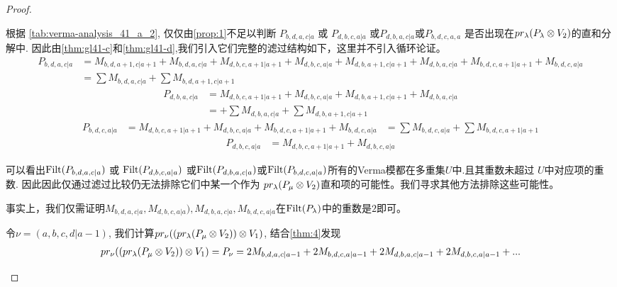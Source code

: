 \begin{proof}
\begin{enumerate}
\begin{enumerate}
\begin{enumerate}
根据 \cref{tab:verma-analysis_41_a_2}, 仅仅由\cref{prop:1}不足以判断 $P_{b,d,a,c|a}$ 或 $P_{d,b,c,a|a}$ 或$P_{d,b,a,c|a}$或$P_{b,d,c,a,a}$ 是否出现在$pr_\lambda(P_\lambda \otimes V_{2})$的直和分解中.
因此由\cref{thm:gl41-c}和\cref{thm:gl41-d},我们引入它们完整的滤过结构如下，这里并不引入循环论证。
\begin{equation}\label{eq:gl41-1}
  \begin{aligned}
    P_{b,d,a,c|a} &= 
M_{b,d,a+1,c|a+1}
+M_{b,d,a,c|a}
+M_{d,b,c,a+1|a+1}
+M_{d,b,c,a|a}
+M_{d,b,a+1,c|a+1}
+M_{d,b,a,c|a}
+M_{b,d,c,a+1|a+1}
+M_{b,d,c,a|a} \\
                  &=
\sum M_{b,d,a,c|a}
+\sum M_{b,d,a+1,c|a+1}
  \end{aligned}
\end{equation}
\begin{equation}\label{eq:gl41-2}
  \begin{aligned}
    P_{d,b,a,c|a} &= 
M_{d,b,c,a+1|a+1}
+M_{d,b,c,a|a}
+M_{d,b,a+1,c|a+1}
+M_{d,b,a,c|a} \\
                  &=
+\sum M_{d,b,a,c|a}
+\sum M_{d,b,a+1,c|a+1}
  \end{aligned}
\end{equation}
\begin{equation}\label{eq:gl41-3}
  \begin{aligned}
    P_{b,d,c,a|a} &= 
M_{d,b,c,a+1|a+1}
+M_{d,b,c,a|a}
+M_{b,d,c,a+1|a+1}
+M_{b,d,c,a|a}
                  &=
\sum M_{b,d,c,a|a}
+\sum M_{b,d,c,a+1|a+1}
  \end{aligned}
\end{equation}
\begin{equation}\label{eq:gl41-4}
  \begin{aligned}
    P_{d,b,c,a|a} &= 
M_{d,b,c,a+1|a+1}
+M_{d,b,c,a|a}
  \end{aligned}
\end{equation}

可以看出$\operatorname{Filt}(P_{b,d,a,c|a})$ 或 $\operatorname{Filt}(P_{d,b,c,a|a})$ 或$\operatorname{Filt}(P_{d,b,a,c|a})$或$\operatorname{Filt}(P_{b,d,c,a|a})$所有的Verma模都在多重集$U$中.且其重数未超过 $U$中对应项的重数. 因此因此仅通过滤过比较仍无法排除它们中某一个作为 $pr_\lambda(P_\mu \otimes V_{2})$直和项的可能性。我们寻求其他方法排除这些可能性。

事实上，我们仅需证明$M_{b,d,a,c|a},M_{d,b,c,a|a}),M_{d,b,a,c|a}, M_{b,d,c,a|a}$在$\operatorname{Filt}(P_{\lambda})$中的重数是$2$即可。


令$\nu = (a,b,c,d|a-1)$, 我们计算$pr_\nu ( ( pr_\lambda(P_\mu \otimes V_{2}) ) \otimes V_1 )$, 结合\cref{thm:4}发现
\begin{equation}\notag
  \begin{aligned}
  pr_\nu ( ( pr_\lambda(P_\mu \otimes V_{2}) ) \otimes V_1 ) =
  P_\nu = 2M_{b,d,a,c|a-1} +2 M_{b,d,c,a|a-1}+2M_{d,b,a,c|a-1} +2 M_{d,b,c,a|a-1}  + ...
  \end{aligned}
\end{equation}


\end{enumerate}
\end{enumerate}
\end{enumerate}
\end{proof}
